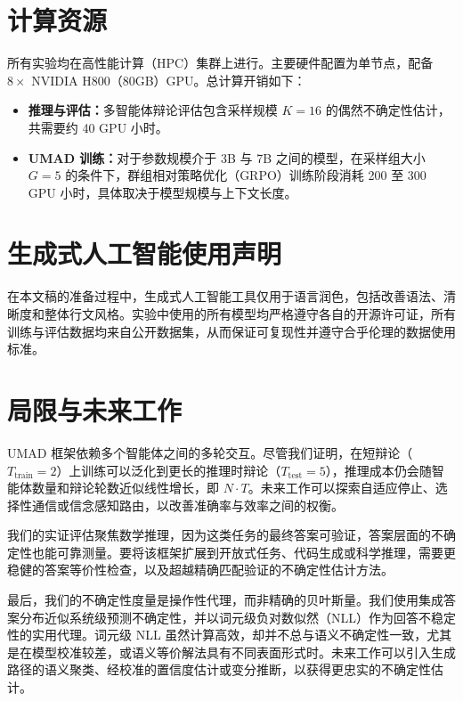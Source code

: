 \documentclass{article}
\theoremstyle{plain}
\theoremstyle{definition}
\theoremstyle{remark}
\begin{document}
\section{计算资源}

所有实验均在高性能计算（HPC）集群上进行。主要硬件配置为单节点，配备 $8 \times$ NVIDIA H800（80GB）GPU。总计算开销如下：

\begin{itemize}

\item \textbf{推理与评估：}多智能体辩论评估包含采样规模 $K=16$ 的偶然不确定性估计，共需要约 40 GPU 小时。

\item \textbf{UMAD 训练：}对于参数规模介于 3B 与 7B 之间的模型，在采样组大小 $G=5$ 的条件下，群组相对策略优化（GRPO）训练阶段消耗 200 至 300 GPU 小时，具体取决于模型规模与上下文长度。

\end{itemize}

\section{生成式人工智能使用声明}

在本文稿的准备过程中，生成式人工智能工具仅用于语言润色，包括改善语法、清晰度和整体行文风格。实验中使用的所有模型均严格遵守各自的开源许可证，所有训练与评估数据均来自公开数据集，从而保证可复现性并遵守合乎伦理的数据使用标准。












\section{局限与未来工作}
UMAD 框架依赖多个智能体之间的多轮交互。尽管我们证明，在短辩论（$T_{\mathrm{train}}=2$）上训练可以泛化到更长的推理时辩论（$T_{\mathrm{test}}=5$），推理成本仍会随智能体数量和辩论轮数近似线性增长，即 $N \cdot T$。未来工作可以探索自适应停止、选择性通信或信念感知路由，以改善准确率与效率之间的权衡。

我们的实证评估聚焦数学推理，因为这类任务的最终答案可验证，答案层面的不确定性也能可靠测量。要将该框架扩展到开放式任务、代码生成或科学推理，需要更稳健的答案等价性检查，以及超越精确匹配验证的不确定性估计方法。

最后，我们的不确定性度量是操作性代理，而非精确的贝叶斯量。我们使用集成答案分布近似系统级预测不确定性，并以词元级负对数似然（NLL）作为回答不稳定性的实用代理。词元级 NLL 虽然计算高效，却并不总与语义不确定性一致，尤其是在模型校准较差，或语义等价解法具有不同表面形式时。未来工作可以引入生成路径的语义聚类、经校准的置信度估计或变分推断，以获得更忠实的不确定性估计。



\end{document}
